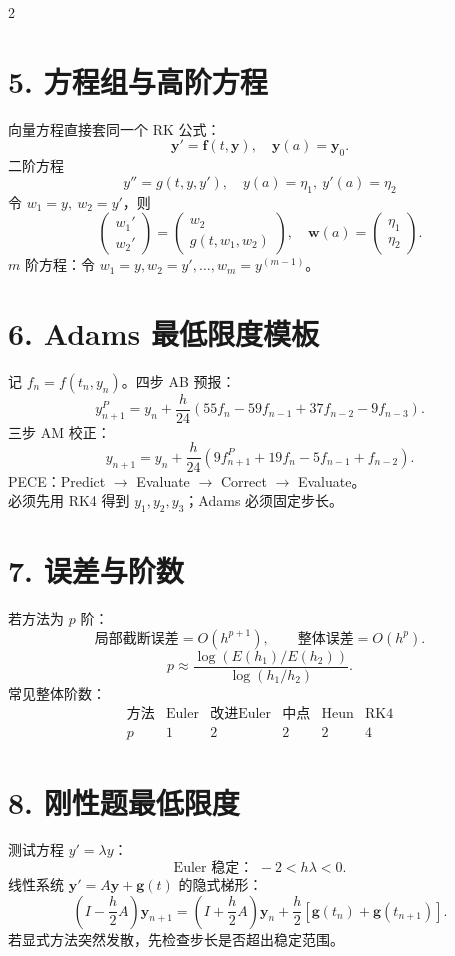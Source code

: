 \documentclass[10pt,a4paper]{ctexart}
\begin{document}
\begin{multicols}{2}
\section*{5. 方程组与高阶方程}
向量方程直接套同一个 RK 公式：
\[
\boldsymbol y'=\boldsymbol f(t,\boldsymbol y),\quad
\boldsymbol y(a)=\boldsymbol y_0.
\]
二阶方程
\[
y''=g(t,y,y'),\quad y(a)=\eta_1,\ y'(a)=\eta_2
\]
令 $w_1=y,\ w_2=y'$，则
\[
\begin{pmatrix}w_1'\\w_2'\end{pmatrix}
=
\begin{pmatrix}w_2\\g(t,w_1,w_2)\end{pmatrix},
\quad
\boldsymbol w(a)=\begin{pmatrix}\eta_1\\\eta_2\end{pmatrix}.
\]
$m$ 阶方程：令 $w_1=y,w_2=y',\ldots,w_m=y^{(m-1)}$。

\section*{6. Adams 最低限度模板}
记 $f_n=f(t_n,y_n)$。四步 AB 预报：
\[
y_{n+1}^{P}=y_n+\frac h{24}
(55f_n-59f_{n-1}+37f_{n-2}-9f_{n-3}).
\]
三步 AM 校正：
\[
y_{n+1}=y_n+\frac h{24}
(9f_{n+1}^{P}+19f_n-5f_{n-1}+f_{n-2}).
\]
PECE：Predict $\to$ Evaluate $\to$ Correct $\to$ Evaluate。\\
必须先用 RK4 得到 $y_1,y_2,y_3$；Adams 必须固定步长。

\section*{7. 误差与阶数}
若方法为 $p$ 阶：
\[
\text{局部截断误差}=O(h^{p+1}),\qquad
\text{整体误差}=O(h^p).
\]
\[
p\approx
\frac{\log(E(h_1)/E(h_2))}
{\log(h_1/h_2)}.
\]
常见整体阶数：
\[
\begin{array}{c|ccccc}
\text{方法}&\text{Euler}&\text{改进Euler}&\text{中点}&\text{Heun}&\text{RK4}\\ \hline
p&1&2&2&2&4
\end{array}
\]

\section*{8. 刚性题最低限度}
测试方程 $y'=\lambda y$：
\[
\text{Euler 稳定： }-2<h\lambda<0.
\]
线性系统 $\boldsymbol y'=A\boldsymbol y+\boldsymbol g(t)$ 的隐式梯形：
\[
\left(I-\frac h2A\right)\boldsymbol y_{n+1}
=\left(I+\frac h2A\right)\boldsymbol y_n
+\frac h2[\boldsymbol g(t_n)+\boldsymbol g(t_{n+1})].
\]
若显式方法突然发散，先检查步长是否超出稳定范围。


\end{multicols}
\end{document}
